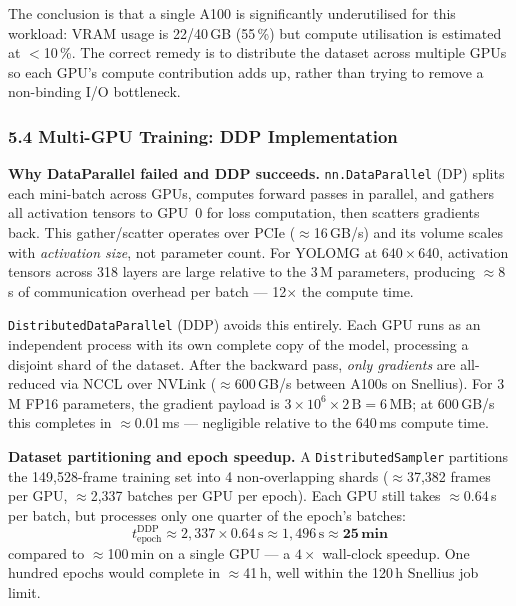 The conclusion is that a single A100 is significantly underutilised
for this workload: VRAM usage is 22/40\,GB (55\,\%) but compute
utilisation is estimated at $<$10\,\%. The correct remedy is to
distribute the dataset across multiple GPUs so each GPU's compute
contribution adds up, rather than trying to remove a non-binding I/O
bottleneck.

\subsubsection*{5.4 Multi-GPU Training: DDP Implementation}

\textbf{Why DataParallel failed and DDP succeeds.}
\texttt{nn.DataParallel} (DP) splits each mini-batch across GPUs,
computes forward passes in parallel, and gathers all activation tensors
to GPU~0 for loss computation, then scatters gradients back. This
gather/scatter operates over PCIe ($\approx$16\,GB/s) and its
volume scales with \emph{activation size}, not parameter count. For
YOLOMG at $640\times640$, activation tensors across 318 layers are
large relative to the 3\,M parameters, producing $\approx$8\,s of
communication overhead per batch — 12$\times$ the compute time.

\texttt{DistributedDataParallel} (DDP) avoids this entirely. Each
GPU runs as an independent process with its own complete copy of the
model, processing a disjoint shard of the dataset. After the backward
pass, \emph{only gradients} are all-reduced via NCCL over NVLink
($\approx$600\,GB/s between A100s on Snellius). For 3\,M FP16
parameters, the gradient payload is $3\times10^6 \times 2\,\text{B}
= 6\,\text{MB}$; at 600\,GB/s this completes in
$\approx$0.01\,ms — negligible relative to the 640\,ms compute time.

\textbf{Dataset partitioning and epoch speedup.}
A \texttt{DistributedSampler} partitions the 149,528-frame training
set into 4 non-overlapping shards ($\approx$37,382 frames per GPU,
$\approx$2,337 batches per GPU per epoch). Each GPU still takes
$\approx$0.64\,s per batch, but processes only one quarter of the
epoch's batches:
\[
    t_{\text{epoch}}^{\text{DDP}} \approx 2{,}337 \times 0.64\,\text{s}
    \approx 1{,}496\,\text{s} \approx \mathbf{25\,\text{min}}
\]
compared to $\approx$100\,min on a single GPU — a $4\times$ wall-clock
speedup. One hundred epochs would complete in $\approx$41\,h, well
within the 120\,h Snellius job limit.

